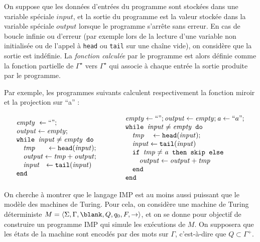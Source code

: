 \begin{exercice}
  On suppose que les données d'entrées du programme sont stockées dans une variable spéciale $\mathit{input}$,
  et la sortie du programme est la valeur stockée dans la variable spéciale $\mathit{output}$ lorsque le programme s'arrête sans erreur.
  En cas de boucle infinie ou d'erreur (par exemple lors de la lecture d'une variable non initialisée ou de l'appel à \texttt{head} ou \texttt{tail} sur une chaîne vide),
  on considère que la sortie est indéfinie.
  La \emph{fonction calculée} par le programme est alors définie comme la fonction partielle
  de $\Gamma^\star$ vers $\Gamma^\star$ qui associe à chaque entrée la sortie produite par le programme.
  
  Par exemple, les programmes suivants calculent respectivement la fonction miroir et la projection sur ``a'' :

  $$
  \begin{array}{l}
    \mathit{empty}~\leftarrow ``" ;\\
    \mathit{output}\leftarrow \mathit{empty} ;\\
    \texttt{while }\mathit{input} \neq \mathit{empty} \texttt{ do } \\
    \quad  \mathit{tmp} ~~~~~\leftarrow \texttt{head}(\mathit{input}) ;\\
    \quad  \mathit{output} \leftarrow \mathit{tmp} + \mathit{output} ;\\
    \quad  \mathit{input} ~~\leftarrow \texttt{tail}(\mathit{input})\\
    \texttt{end}
  \end{array}
  \quad\quad\quad
  \begin{array}{l}
    \mathit{empty}\leftarrow ``" ; \mathit{output}\leftarrow \mathit{empty} ; \mathit{a}\leftarrow ``a" ; \\
    \texttt{while }\mathit{input} \neq \mathit{empty} \texttt{ do } \\
    \quad  \mathit{tmp} ~~~\leftarrow \texttt{head}(\mathit{input}) ;\\
    \quad  \mathit{input} \leftarrow \texttt{tail}(\mathit{input})\\
    \quad  \texttt{if }\mathit{tmp} \neq \mathit{a} \texttt{ then skip else } \\
    \quad\quad  \mathit{output} \leftarrow \mathit{output} + \mathit{tmp} \\
    \quad  \texttt{end }\\
    \texttt{end}
  \end{array}
  $$

  On cherche à montrer que le langage IMP est au moins aussi puissant que le modèle des machines de Turing.
  Pour cela, on considère une machine de Turing déterministe
  $M = \langle \Sigma, \Gamma, \blank, Q, q_0, F, \rightarrow \rangle$,
  et on se donne pour objectif de construire un programme IMP qui simule les exécutions de $M$.
  On supposera que les états de la machine sont encodés par des mots sur $\Gamma$,
  c'est-à-dire que $Q \subset \Gamma^+$.


\end{exercice}
